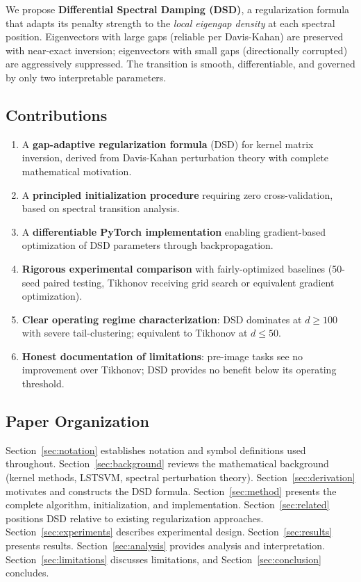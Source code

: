 \documentclass[preprint,review,12pt]{elsarticle}
\begin{document}
We propose \textbf{Differential Spectral Damping (DSD)}, a regularization formula that adapts its penalty strength to the \emph{local eigengap density} at each spectral position. Eigenvectors with large gaps (reliable per Davis-Kahan) are preserved with near-exact inversion; eigenvectors with small gaps (directionally corrupted) are aggressively suppressed. The transition is smooth, differentiable, and governed by only two interpretable parameters.

\subsection{Contributions}

\begin{enumerate}
\item A \textbf{gap-adaptive regularization formula} (DSD) for kernel matrix inversion, derived from Davis-Kahan perturbation theory with complete mathematical motivation.
\item A \textbf{principled initialization procedure} requiring zero cross-validation, based on spectral transition analysis.
\item A \textbf{differentiable PyTorch implementation} enabling gradient-based optimization of DSD parameters through backpropagation.
\item \textbf{Rigorous experimental comparison} with fairly-optimized baselines (50-seed paired testing, Tikhonov receiving grid search or equivalent gradient optimization).
\item \textbf{Clear operating regime characterization}: DSD dominates at $d \geq 100$ with severe tail-clustering; equivalent to Tikhonov at $d \leq 50$.
\item \textbf{Honest documentation of limitations}: pre-image tasks see no improvement over Tikhonov; DSD provides no benefit below its operating threshold.
\end{enumerate}

\subsection{Paper Organization}

Section~\ref{sec:notation} establishes notation and symbol definitions used throughout. Section~\ref{sec:background} reviews the mathematical background (kernel methods, LSTSVM, spectral perturbation theory). Section~\ref{sec:derivation} motivates and constructs the DSD formula. Section~\ref{sec:method} presents the complete algorithm, initialization, and implementation. Section~\ref{sec:related} positions DSD relative to existing regularization approaches. Section~\ref{sec:experiments} describes experimental design. Section~\ref{sec:results} presents results. Section~\ref{sec:analysis} provides analysis and interpretation. Section~\ref{sec:limitations} discusses limitations, and Section~\ref{sec:conclusion} concludes.
\end{document}
